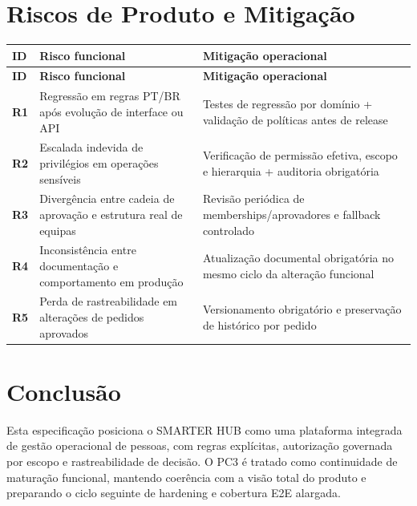 \documentclass[11pt,a4paper,twoside]{article}
\newcommand{\tH}[1]{\textbf{\sffamily\small\color{white}#1}}
\newcommand{\theadrow}{\rowcolor{ACCENT}}
\begin{document}
\section{Riscos de Produto e Mitigação}

\begin{longtable}{>{\small\bfseries}p{0.9cm} >{\small}p{6.1cm} >{\small}p{6.0cm}}
\theadrow
\tH{ID} & \tH{Risco funcional} & \tH{Mitigação operacional} \\
\midrule
\endfirsthead
\theadrow
\tH{ID} & \tH{Risco funcional} & \tH{Mitigação operacional} \\
\midrule
\endhead
R1 & Regressão em regras PT/BR após evolução de interface ou API & Testes de regressão por domínio + validação de políticas antes de release \\
R2 & Escalada indevida de privilégios em operações sensíveis & Verificação de permissão efetiva, escopo e hierarquia + auditoria obrigatória \\
R3 & Divergência entre cadeia de aprovação e estrutura real de equipas & Revisão periódica de memberships/aprovadores e fallback controlado \\
R4 & Inconsistência entre documentação e comportamento em produção & Atualização documental obrigatória no mesmo ciclo da alteração funcional \\
R5 & Perda de rastreabilidade em alterações de pedidos aprovados & Versionamento obrigatório e preservação de histórico por pedido \\
\bottomrule
\end{longtable}

\section{Conclusão}

Esta especificação posiciona o SMARTER HUB como uma plataforma integrada de gestão operacional de pessoas, com regras explícitas, autorização governada por escopo e rastreabilidade de decisão. O PC3 é tratado como continuidade de maturação funcional, mantendo coerência com a visão total do produto e preparando o ciclo seguinte de hardening e cobertura E2E alargada.
\end{document}
